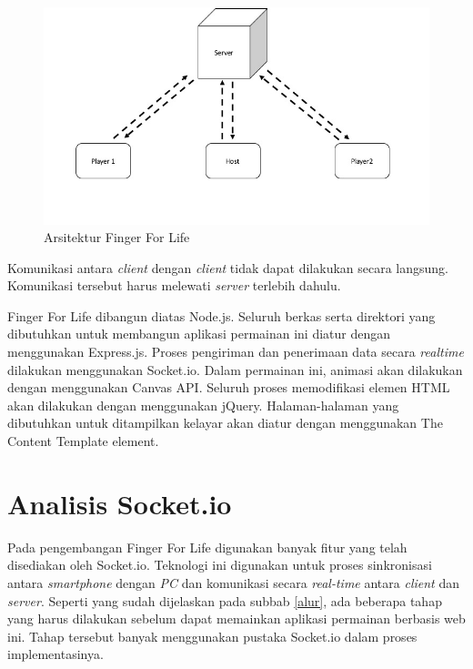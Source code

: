 \begin{figure}[H]
	\centering
	\includegraphics[scale=0.45]{Gambar/ars_fingerforlife}
	\caption{Arsitektur Finger For Life}
	\label{fig:ars_fingerforlife}
\end{figure}

Komunikasi antara \textit{client} dengan \textit{client} tidak dapat dilakukan secara langsung. Komunikasi tersebut harus melewati \textit{server} terlebih dahulu. 

Finger For Life dibangun diatas Node.js. Seluruh berkas serta direktori yang dibutuhkan untuk membangun aplikasi permainan ini diatur dengan menggunakan Express.js. Proses pengiriman dan penerimaan data secara \textit{realtime} dilakukan menggunakan Socket.io. Dalam permainan ini, animasi akan dilakukan dengan menggunakan Canvas API. Seluruh proses memodifikasi elemen HTML akan dilakukan dengan menggunakan jQuery. Halaman-halaman yang dibutuhkan untuk ditampilkan kelayar akan diatur dengan menggunakan The Content Template element.

\section{Analisis Socket.io}
Pada pengembangan Finger For Life digunakan banyak fitur yang telah disediakan oleh Socket.io. Teknologi ini digunakan untuk proses sinkronisasi antara \textit{smartphone} dengan \textit{PC} dan komunikasi secara \textit{real-time} antara \textit{client} dan \textit{server}. Seperti yang sudah dijelaskan pada subbab \ref{alur}, ada beberapa tahap yang harus dilakukan sebelum dapat memainkan aplikasi permainan berbasis web ini. Tahap tersebut banyak menggunakan pustaka Socket.io dalam proses implementasinya.


